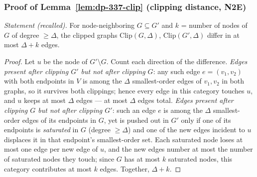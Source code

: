 \subsubsection*{Proof of Lemma~\ref{lem:dp-337-clip} (clipping distance, N2E)}
{\itshape Statement (recalled).} For node-neighboring $G \subseteq G'$ and $k$ = number
of nodes of $G$ of degree $\ge \Delta$, the clipped graphs
$\mathrm{Clip}(G,\Delta)$, $\mathrm{Clip}(G',\Delta)$ differ in at most $\Delta + k$
edges.\eop

\begin{proof}
Let $u$ be the node of $G' \setminus G$. Count each direction of the difference.
\emph{Edges present after clipping $G'$ but not after clipping $G$}: any such edge
$e = (v_1, v_2)$ with both endpoints in $V$ is among the $\Delta$ smallest-order edges
of $v_1, v_2$ in both graphs, so it survives both clippings; hence every edge in this
category touches $u$, and $u$ keeps at most $\Delta$ edges --- at most $\Delta$ edges
total. \emph{Edges present after clipping $G$ but not after clipping $G'$}: such an edge
$e$ is among the $\Delta$ smallest-order edges of its endpoints in $G$, yet is pushed
out in $G'$ only if one of its endpoints is \emph{saturated} in $G$ (degree
$\ge \Delta$) and one of the new edges incident to $u$ displaces it in that endpoint's
smallest-order set. Each saturated node loses at most one edge per new edge of $u$, and
the new edges number at most the number of saturated nodes they touch; since $G$ has at
most $k$ saturated nodes, this category contributes at most $k$ edges. Together,
$\Delta + k$.
\end{proof}



